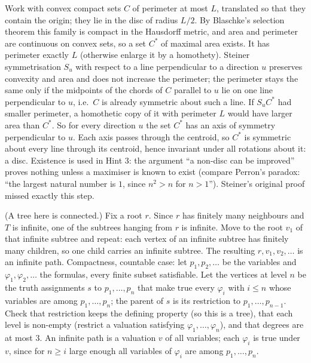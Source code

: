\documentclass[11pt,a4paper]{article}
\begin{document}
 Work with convex compact sets $C$ of perimeter at most $L$, translated so that they contain the origin; they lie in the disc of radius $L/2$. By Blaschke's selection theorem this family is compact in the Hausdorff metric, and area and perimeter are continuous on convex sets, so a set $C^*$ of maximal area exists. It has perimeter exactly $L$ (otherwise enlarge it by a homothety).
 Steiner symmetrisation $S_u$ with respect to a line perpendicular to a direction $u$ preserves convexity and area and does not increase the perimeter; the perimeter stays the same only if the midpoints of the chords of $C$ parallel to $u$ lie on one line perpendicular to $u$, i.e.\ $C$ is already symmetric about such a line.
 If $S_uC^*$ had smaller perimeter, a homothetic copy of it with perimeter $L$ would have larger area than $C^*$. So for every direction $u$ the set $C^*$ has an axis of symmetry perpendicular to $u$. Each axis passes through the centroid, so $C^*$ is symmetric about every line through its centroid, hence invariant under all rotations about it: a disc.
 Existence is used in Hint 3: the argument ``a non-disc can be improved'' proves nothing unless a maximiser is known to exist (compare Perron's paradox: ``the largest natural number is $1$, since $n^2>n$ for $n>1$''). Steiner's original proof missed exactly this step.

 (A tree here is connected.) Fix a root $r$. Since $r$ has finitely many neighbours and $T$ is infinite, one of the subtrees hanging from $r$ is infinite.
 Move to the root $v_1$ of that infinite subtree and repeat: each vertex of an infinite subtree has finitely many children, so one child carries an infinite subtree. The resulting $r,v_1,v_2,\dots$ is an infinite path.
 Compactness, countable case: let $p_1,p_2,\dots$ be the variables and $\varphi_1,\varphi_2,\dots$ the formulas, every finite subset satisfiable. Let the vertices at level $n$ be the truth assignments $s$ to $p_1,\dots,p_n$ that make true every $\varphi_i$ with $i\le n$ whose variables are among $p_1,\dots,p_n$; the parent of $s$ is its restriction to $p_1,\dots,p_{n-1}$.
 Check that restriction keeps the defining property (so this is a tree), that each level is non-empty (restrict a valuation satisfying $\varphi_1,\dots,\varphi_n$), and that degrees are at most $3$. An infinite path is a valuation $v$ of all variables; each $\varphi_i$ is true under $v$, since for $n\ge i$ large enough all variables of $\varphi_i$ are among $p_1,\dots,p_n$.
\end{document}
